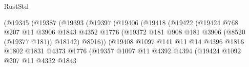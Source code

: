 \begin{lexlean}{RustStd}
\begin{coremodule}
                                      (@19345
                                        (@19387
                                          (@19393
                                            (@19397
                                              (@19406
                                                (@19418
                                                  (@19422
                                                    (@19424
                                                      @768
                                                      @207
                                                      @11
                                                      @3906
                                                      @1843
                                                      @4352
                                                      @1776
                                                      (@19372
                                                        @181
                                                        @908
                                                        @181
                                                        @3906
                                                        (@8520 (@19377 @181))
                                                        @18142)
                                                      @8916))
                                                  (@19408
                                                    @1097
                                                    @141
                                                    @11
                                                    @14
                                                    @4396
                                                    @1816
                                                    @1802
                                                    @1831
                                                    @4373
                                                    @1776
                                                    (@19357
                                                      @1097
                                                      @11
                                                      @4392
                                                      @4394
                                                      (@19424
                                                        @1092
                                                        @207
                                                        @11
                                                        @4332
                                                        @1843

\end{coremodule}
\end{lexlean}
